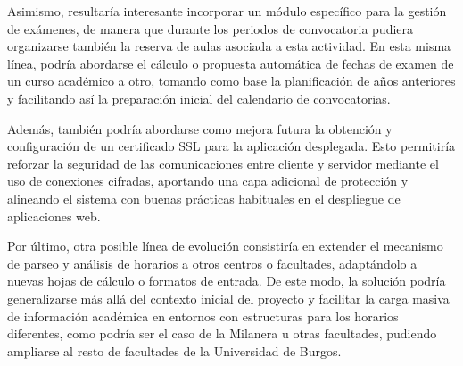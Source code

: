 Asimismo, resultaría interesante incorporar un módulo específico para la gestión de exámenes, de manera que durante los periodos de convocatoria pudiera organizarse también la reserva de aulas asociada a esta actividad. En esta misma línea, podría abordarse el cálculo o propuesta automática de fechas de examen de un curso académico a otro, tomando como base la planificación de años anteriores y facilitando así la preparación inicial del calendario de convocatorias.

Además, también podría abordarse como mejora futura la obtención y configuración de un certificado SSL para la aplicación desplegada. Esto permitiría reforzar la seguridad de las comunicaciones entre cliente y servidor mediante el uso de conexiones cifradas, aportando una capa adicional de protección y alineando el sistema con buenas prácticas habituales en el despliegue de aplicaciones web.

Por último, otra posible línea de evolución consistiría en extender el mecanismo de parseo y análisis de horarios a otros centros o facultades, adaptándolo a nuevas hojas de cálculo o formatos de entrada. De este modo, la solución podría generalizarse más allá del contexto inicial del proyecto y facilitar la carga masiva de información académica en entornos con estructuras para los horarios diferentes, como podría ser el caso de la Milanera u otras facultades, pudiendo ampliarse al resto de facultades de la Universidad de Burgos.